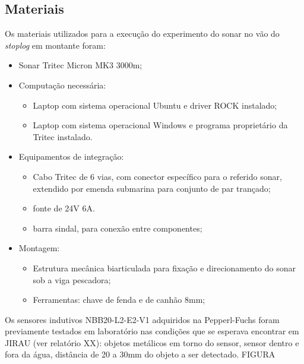 


\subsection{Materiais}
\label{materials}
Os materiais utilizados para a execução do experimento do sonar no vão do
\emph{stoplog} em montante foram:
\begin{itemize}
  \item Sonar Tritec Micron MK3 3000m;
  
  \item Computação necessária:
  \begin{itemize}
    \item Laptop com sistema operacional Ubuntu e driver ROCK instalado;
    \item Laptop com sistema operacional Windows e programa proprietário da Tritec instalado.
  \end{itemize}
  
  \item Equipamentos de integração:
  \begin{itemize}
    \item Cabo Tritec de 6 vias, com conector específico para o referido sonar,
  extendido por emenda submarina para conjunto de par trançado;
    \item fonte de 24V 6A.
    \item barra sindal, para conexão entre componentes;
  \end{itemize}
  
  \item Montagem:
  \begin{itemize}
    \item Estrutura mecânica biarticulada para fixação e direcionamento do sonar
  sob a viga pescadora;
    \item Ferramentas: chave de fenda e de canhão 8mm;
  \end{itemize}
\end{itemize}


Os sensores indutivos NBB20-L2-E2-V1 adquiridos na Pepperl-Fuchs foram
previamente testados em laboratório nas condições que se esperava encontrar em JIRAU (ver relatório XX): objetos
metálicos em torno do sensor, sensor dentro e fora da água, distância de 20 a
30mm do objeto a ser detectado. FIGURA

